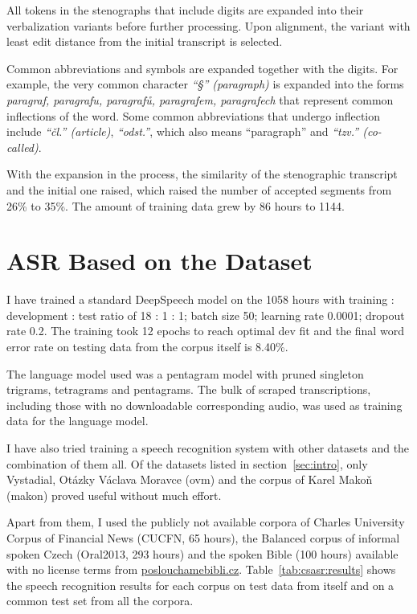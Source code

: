 \documentclass[conference]{IEEEtran}
\begin{document}
All tokens in the stenographs that include digits are expanded into their
verbalization variants before further processing. Upon alignment, the variant
with least edit distance from the initial transcript is selected.

Common abbreviations and symbols are expanded together with the digits. For
example, the very common character \textit{``§'' (paragraph)} is expanded into
the forms \textit{paragraf, paragrafu, paragrafů, paragrafem,
paragrafech} that represent common inflections of the word. Some common
abbreviations that undergo inflection include \textit{``čl.'' (article)},
\textit{``odst.''}, which also means ``paragraph'' and \textit{``tzv.''
(co-called)}.

With the expansion in the process, the similarity of the stenographic transcript
and the initial one raised, which raised the number of accepted segments from
26\% to 35\%. The amount of training data grew by 86 hours to 1144.

\section{ASR Based on the Dataset}

I have trained a standard DeepSpeech\cite{hannun2014deep} model on the 1058
hours with training :
development : test ratio of 18 : 1 : 1; batch size 50; learning rate 0.0001; dropout
rate 0.2. The training took 12 epochs to reach optimal dev fit and the final
word error rate on testing data from the corpus itself is 8.40\%.

The language model used was a pentagram model with pruned singleton trigrams,
tetragrams and pentagrams. The bulk of scraped transcriptions, including those
with no downloadable corresponding audio, was used as training data for the
language model.

I have also tried training a speech recognition system with other datasets and
the combination of them all. Of the datasets listed in
section~\ref{sec:intro}, only Vystadial, Otázky Václava Moravce (ovm) and the
corpus of Karel Makoň (makon) proved useful without much effort.

Apart from them, I used the publicly not available corpora of Charles University
Corpus of Financial News (CUCFN, 65 hours)\cite{byrne1999large}, the Balanced
corpus of informal spoken Czech (Oral2013, 293 hours)\cite{oral2013} and the
spoken Bible (100 hours) available with no license terms from
\url{poslouchamebibli.cz}. Table~\ref{tab:csasr:results} shows the speech recognition
results for each corpus on test data from itself and on a common test set from
all the corpora.
\end{document}
